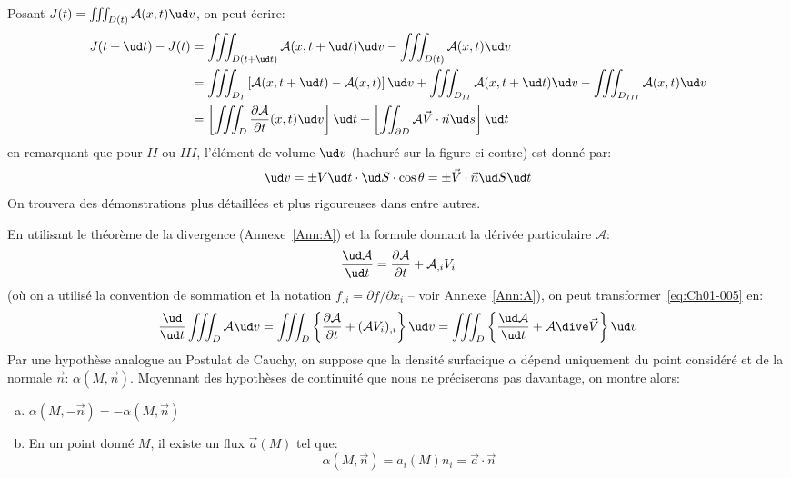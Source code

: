 Posant $J(t)=\iiint_{D(t)} \mathcal{A}(x,t) \ud v$, on peut écrire:
\begin{equation*}
    \begin{aligned}
        J(t+\ud t)-J(t) & =\iiint_{D(t+\ud t)} \mathcal{A}(x,t+\ud t) \ud v-\iiint_{D(t)} \mathcal{A}(x,t) \ud v\\
                        & =\iiint_{D_I} \left[\mathcal{A}(x,t+\ud t)-\mathcal{A}(x,t)\right] \ud v+\iiint_{D_{II}} \mathcal{A}(x,t+\ud t) \ud v-\iiint_{D_{III}} \mathcal{A}(x,t) \ud v\\
                        & =\left[\iiint_{D} \frac{\partial \mathcal{A}}{\partial t}(x,t) \ud v\right]\ud t+ \left[\iint_{\partial D} \mathcal{A}\vec{V}\cdot\vec{n} \ud s\right]\ud t
    \end{aligned}
\end{equation*}
en remarquant que pour $II$ ou $III$, l'élément de volume $\ud v$ (hachuré sur la figure ci-contre) est donné par:
\begin{equation*}
    \ud v=\pm V \ud t \cdot \ud S \cdot \cos\theta = \pm \vec{V}\cdot\vec{n} \ud S \ud t
\end{equation*}
On trouvera des démonstrations plus détaillées et plus rigoureuses dans \cite{Germain-62,Germain-73,Mandel-66,Gontier-69} entre autres.

En utilisant le théorème de la divergence (Annexe~\ref{Ann:A}) et la formule donnant la dérivée particulaire $\mathcal{A}$:
\begin{equation*}
    \frac{\ud \mathcal{A}}{\ud t}=\frac{\partial \mathcal{A}}{\partial t}+\mathcal{A}_{,i}V_i
\end{equation*}
(où on a utilisé la convention de sommation et la notation $f_{,i}=\partial f/\partial x_i$ -- voir Annexe~\ref{Ann:A}), on peut transformer~\eqref{eq:Ch01-005} en:
\begin{equation}
    \frac{\ud}{\ud t}\iiint_{D} \mathcal{A} \ud v=\iiint_{D}\left\{\frac{\partial\mathcal{A}}{\partial t}+(\mathcal{A}V_i)_{,i}\right\} \ud v=\iiint_{D} \left\{\frac{\ud\mathcal{A}}{\ud t}+\mathcal{A}\dive\vec{V}\right\} \ud v
    \label{eq:Ch01-006}
\end{equation}
Par une hypothèse analogue au Postulat de Cauchy, on suppose que la densité surfacique $\alpha$ dépend uniquement du point considéré et de la normale $\vec{n}$: $\alpha(M,\vec{n})$.
Moyennant des hypothèses de continuité que nous ne préciserons pas davantage, on montre alors:

\begin{lem}
    \hfill
    \begin{enumerate}[(a)]
        \item $\alpha(M,-\vec{n}) =-\alpha(M,\vec{n})$
        \item En un point donné $M$, il existe un flux $\vec{a}(M)$ tel que:
        \begin{equation}
            \alpha(M,\vec{n}) =a_i(M)n_i=\vec{a}\cdot\vec{n}
            \label{eq:Ch01-007}
        \end{equation}
    \end{enumerate}
    \label{lem:Ch01-2}
\end{lem}

